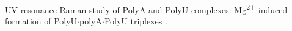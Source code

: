 
\noindent
\begin{docenum}
\item UV resonance Raman study of PolyA and PolyU complexes:
    Mg\textsuperscript{2+}-induced formation of PolyU$\cdot$polyA$\cdot$PolyU
		triplexes \parencite{Klener2015}.
\end{docenum}